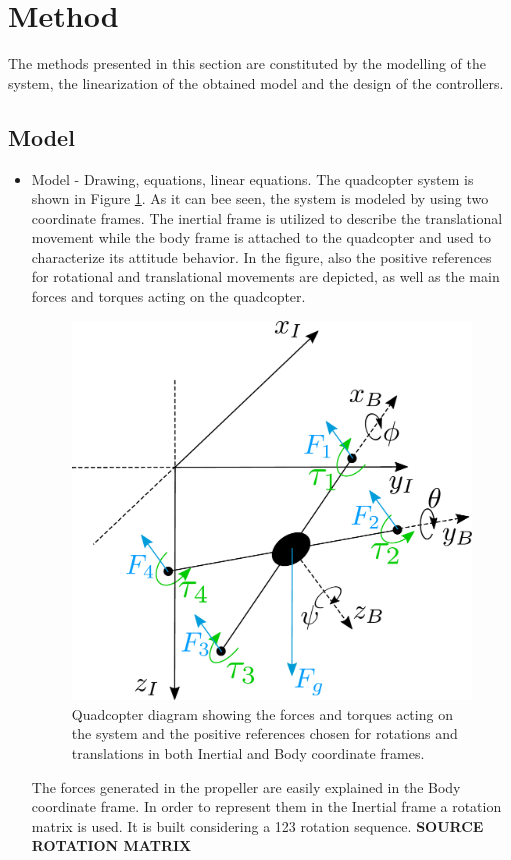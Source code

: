 \section{Method}
The methods presented in this section are constituted by the modelling of the system, the linearization of the obtained model and the design of the controllers.
\subsection{Model}
\begin{itemize}
\item Model - Drawing, equations, linear equations.
The quadcopter system is shown in Figure \ref{droneDiagram}. As it can bee seen, the system is modeled by using two coordinate frames. The inertial frame is utilized to describe the translational movement while the body frame is attached to the quadcopter and used to characterize its attitude behavior. In the figure, also the positive references for rotational and translational movements are depicted, as well as the main forces and torques acting on the quadcopter. 
\begin{figure}[H]
	\centering
	\includegraphics[scale=0.3]{droneDiagram}
	\caption{Quadcopter diagram showing the forces and torques acting on the system and the positive references chosen for rotations and translations in both Inertial and Body coordinate frames.}
	\label{droneDiagram}
\end{figure}
The forces generated in the propeller are easily explained in the Body coordinate frame. In order to represent them in the Inertial frame a rotation matrix is used. It is built considering a 123 rotation sequence. \textbf{SOURCE ROTATION  MATRIX}
 

\end{itemize}
